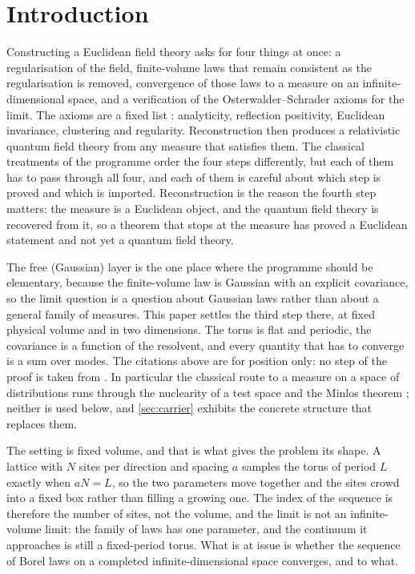 \section{Introduction}\label{sec:intro}

Constructing a Euclidean field theory asks for four things at once: a
regularisation of the field, finite-volume laws that remain consistent as the
regularisation is removed, convergence of those laws to a measure on an
infinite-dimensional space, and a verification of the Osterwalder--Schrader
axioms for the limit.  The axioms are a fixed list
\cite{ossier1973,ossier1975}: analyticity, reflection positivity, Euclidean
invariance, clustering and regularity.  Reconstruction then produces a
relativistic quantum field theory from any measure that satisfies them.  The
classical treatments of the programme \cite{gj1987,simon1974,grs1975,nelson1973}
order the four steps differently, but each of them has to pass through all four,
and each of them is careful about which step is proved and which is imported.
Reconstruction is the reason the fourth step matters: the measure is a Euclidean
object, and the quantum field theory is recovered from it, so a theorem that
stops at the measure has proved a Euclidean statement and not yet a quantum
field theory.

The free (Gaussian) layer is the one place where the programme should be
elementary, because the finite-volume law is Gaussian with an explicit
covariance, so the limit question is a question about Gaussian laws rather than
about a general family of measures.  This paper settles the third step there, at
fixed physical volume and in two dimensions.  The torus is flat and periodic,
the covariance is a function of the resolvent, and every quantity that has to
converge is a sum over modes.
The citations above are for position only: no step of the proof is taken from
\cite{ossier1973,ossier1975,minlos1959,gj1987,simon1974,nelson1973,grs1975}.
In particular the classical route to a measure on a space of distributions runs
through the nuclearity of a test space and the Minlos theorem
\cite{minlos1959}; neither is used below, and \cref{sec:carrier} exhibits the
concrete structure that replaces them.

The setting is fixed volume, and that is what gives the problem its shape.  A
lattice with $N$ sites per direction and spacing $a$ samples the torus of
period $L$ exactly when $aN = L$, so the two parameters move together and the
sites crowd into a fixed box rather than filling a growing one.  The index of
the sequence is therefore the number of sites, not the volume, and the limit is
not an infinite-volume limit: the family of laws has one parameter, and the
continuum it approaches is still a fixed-period torus.  What is at issue is
whether the sequence of Borel laws on a completed infinite-dimensional space
converges, and to what.

